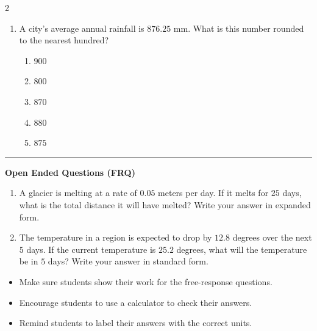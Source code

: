 \documentclass[10pt]{article}
\begin{document}
\begin{multicols}{2}
\begin{enumerate}[label=\textbf{Q\arabic*.}, leftmargin=*, itemsep=6pt, parsep=0pt]
  \item \small A city's average annual rainfall is $876.25$ mm. What is this number rounded to the nearest hundred?
  \begin{enumerate}[label=(\Alph*), leftmargin=0.6cm, nosep, itemsep=2pt]
    \item $900$
    \item $800$
    \item $870$
    \item $880$
    \item $875$
  \end{enumerate}

\end{enumerate}
\end{multicols}

\vspace{-0.2cm}
\hrule
\vspace{0.2cm}
\textbf{\small Open Ended Questions (FRQ)}
\begin{enumerate}[label=\textbf{Q\arabic*.}, start=9, itemsep=5pt, topsep=0pt]

  \item \small A glacier is melting at a rate of $0.05$ meters per day. If it melts for $25$ days, what is the total distance it will have melted? Write your answer in expanded form. \vspace{2cm}

  \item \small The temperature in a region is expected to drop by $12.8$ degrees over the next $5$ days. If the current temperature is $25.2$ degrees, what will the temperature be in $5$ days? Write your answer in standard form. \vspace{2cm}

\end{enumerate}

\vfill

\begin{tcolorbox}[colback=blue!5, colframe=mainblue!50, title=\small \textbf{Chef's Tips}, fonttitle=\bfseries, bottom=1mm]
\begin{itemize}[noitemsep, topsep=2pt, leftmargin=0.5cm]
  \item \scriptsize Make sure students show their work for the free-response questions.\item \scriptsize Encourage students to use a calculator to check their answers.\item \scriptsize Remind students to label their answers with the correct units.
\end{itemize}
\end{tcolorbox}
\end{document}
